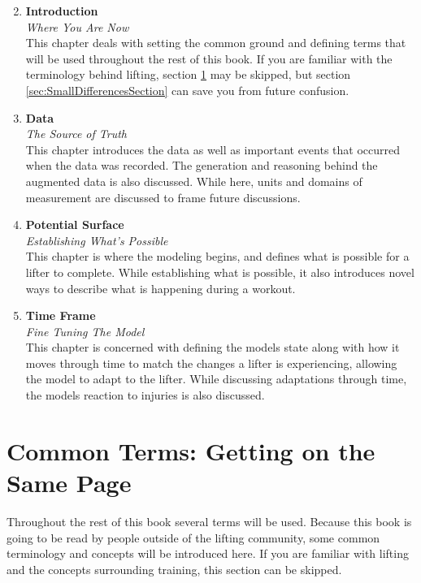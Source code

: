 \begin{enumerate}
    \setcounter{enumi}{1}
    \item \textbf{Introduction} \\ \textit{Where You Are Now} \\
    		This chapter deals with setting the common ground and defining terms that will be used throughout the rest of this book. If you are familiar with the terminology behind lifting, section \ref{sec:CommonTermsSection} may be skipped, but section \ref{sec:SmallDifferencesSection} can save you from future confusion.
    		
    \item \textbf{Data} \\ \textit{The Source of Truth} \\
        This chapter introduces the data as well as important events that occurred when the data was recorded. The generation and reasoning behind the augmented data is also discussed. While here, units and domains of measurement are discussed to frame future discussions.
        
    \item \textbf{Potential Surface} \\ \textit{Establishing What's Possible} \\
        This chapter is where the modeling begins, and defines what is possible for a lifter to complete. While establishing what is possible, it also introduces novel ways to describe what is happening during a workout.
        
    \item \textbf{Time Frame} \\ \textit{Fine Tuning The Model} \\
        This chapter is concerned with defining the models state along with how it moves through time to match the changes a lifter is experiencing, allowing the model to adapt to the lifter. While discussing adaptations through time, the models reaction to injuries is also discussed.
\end{enumerate}

\section{Common Terms: Getting on the Same Page}
\label{sec:CommonTermsSection}

Throughout the rest of this book several terms will be used. Because this book is going to be read by people outside of the lifting community, some common terminology and concepts will be introduced here. If you are familiar with lifting and the concepts surrounding training, this section can be skipped.

